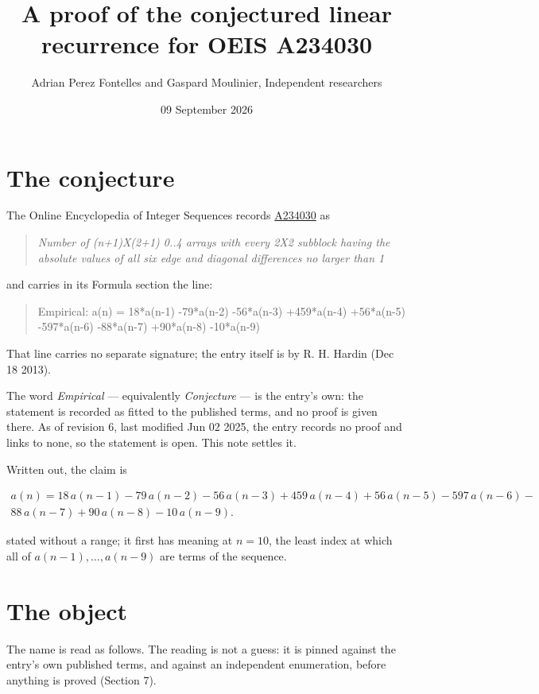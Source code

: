 \documentclass[11pt]{article}
\title{A proof of the conjectured linear recurrence for OEIS A234030}
\author{Adrian Perez Fontelles and Gaspard Moulinier, Independent researchers}
\date{09 September 2026}
\theoremstyle{definition}
\begin{document}
\maketitle
\section{The conjecture}

The Online Encyclopedia of Integer Sequences records \href{https://oeis.org/A234030}{A234030} as

\begin{quote}\itshape Number of (n+1)X(2+1) 0..4 arrays with every 2X2 subblock having the absolute values of all six edge and diagonal differences no larger than 1\end{quote}

and carries in its Formula section the line:

\begin{quote}\ttfamily Empirical: a(n) = 18*a(n-1) -79*a(n-2) -56*a(n-3) +459*a(n-4) +56*a(n-5) -597*a(n-6) -88*a(n-7) +90*a(n-8) -10*a(n-9)\end{quote}

That line carries no separate signature; the entry itself is by R. H. Hardin (Dec 18 2013).

The word {\itshape Empirical} --- equivalently {\itshape Conjecture} --- is the entry's own: the statement is recorded as fitted to the published terms, and no proof is given there. As of revision 6, last modified Jun 02 2025, the entry records no proof and links to none, so the statement is open. This note settles it.

Written out, the claim is

\begin{multline*} a(n) = 18\,a(n-1) - 79\,a(n-2) - 56\,a(n-3) + 459\,a(n-4) + 56\,a(n-5) - 597\,a(n-6) - \\ 88\,a(n-7) + 90\,a(n-8) - 10\,a(n-9). \end{multline*}

stated without a range; it first has meaning at $n = 10$, the least index at which all of $a(n-1),\dots,a(n-9)$ are terms of the sequence.

\section{The object}

The name is read as follows. The reading is not a guess: it is pinned against the entry's own published terms, and against an independent enumeration, before anything is proved (Section 7).
\end{document}
